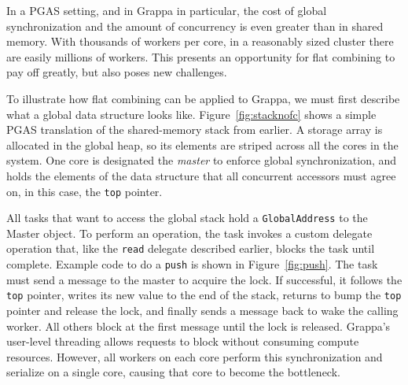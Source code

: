 In a PGAS setting, and in Grappa in particular, the cost of global synchronization and the amount of concurrency is even greater than in shared memory. With thousands of workers per core, in a reasonably sized cluster there are easily millions of workers. This presents an opportunity for flat combining to pay off greatly, but also poses new challenges.


To illustrate how flat combining can be applied to Grappa, we must first describe what a global data structure looks like. Figure~\ref{fig:stacknofc} shows a simple PGAS translation of the shared-memory stack from earlier. A storage array is allocated in the global heap, so its elements are striped across all the cores in the system. One core is designated the \emph{master} to enforce global synchronization, and holds the elements of the data structure that all concurrent accessors must agree on, in this case, the \texttt{top} pointer.

All tasks that want to access the global stack hold a \texttt{GlobalAddress} to the Master object. To perform an operation, the task invokes a custom delegate operation that, like the \texttt{read} delegate described earlier, blocks the task until complete. Example code to do a \texttt{push} is shown in Figure~\ref{fig:push}. The task must send a message to the master to acquire the lock. If successful, it follows the \texttt{top} pointer, writes its new value to the end of the stack, returns to bump the \texttt{top} pointer and release the lock, and finally sends a message back to wake the calling worker. All others block at the first message until the lock is released. Grappa's user-level threading allows requests to block without consuming compute resources. However, all workers on each core perform this synchronization and serialize on a single core, causing that core to become the bottleneck.

